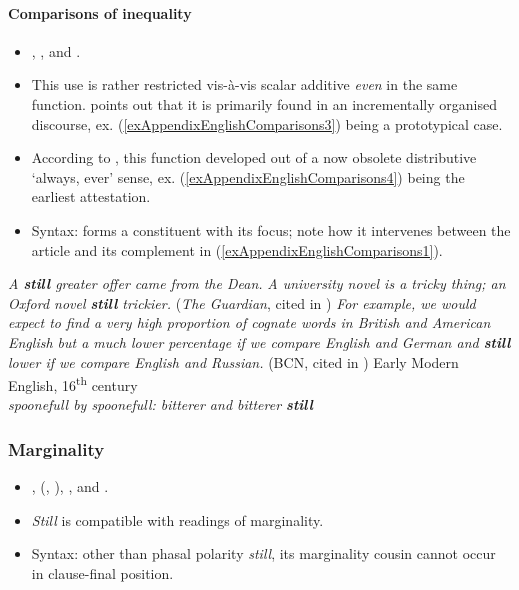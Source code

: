 \paragraph{Comparisons of inequality}\label{appendixEnglishComparisons}
\begin{itemize}
	\item \textcite{Ippolito2007} \textcite[145]{Koenig1991}, \textcite{Lewis2019}, \textcite[198–201]{Ranger2018} and \textcite[s.v. \textit{still}]{OED2022}.
	\item This use is rather restricted vis-à-vis scalar additive \textit{even} in the same function. \textcite{Ranger2018} points out that it is primarily found in an incrementally organised discourse, ex. (\ref{exAppendixEnglishComparisons3}) being a prototypical case.
	\item According to \textcite{Lewis2019}, this function developed out of a now obsolete distributive \lq always, ever\rq{ }sense, ex. (\ref{exAppendixEnglishComparisons4}) being the earliest attestation.
	\item Syntax: forms a constituent with its focus; note how it intervenes between the article and its complement in (\ref{exAppendixEnglishComparisons1}).
\end{itemize}

\begin{exe}
	\ex \textit{A \textbf{still} greater offer came from the Dean.} \parencite[23 fn37]{Ippolito2007}\label{exAppendixEnglishComparisons1}
	\ex\textit{A university novel is a tricky thing; an Oxford novel \textbf{still} trickier.} (\textit{The Guardian}, cited in \cite[129]{Lewis2019})
		\ex\label{exAppendixEnglishComparisons3}
		 \textit{For example, we would expect to find a very high proportion of cognate words in British and American English but a much lower percentage if we compare English and German and \textbf{still} lower if we compare English and Russian.} (BCN, cited in \cite[200]{Ranger2018})
\ex Early Modern English, 16\textsuperscript{th} century\label{exAppendixEnglishComparisons4}\\
	\textit{spoonefull by spoonefull: bitterer and bitterer 	\textbf{still}} \parencite[135]{Lewis2019}
\end{exe}


\subsubsection{Marginality}
\label{appendixEnglishMarginal}
\begin{itemize}
	\item \textcite{Beck2020}, \citeauthor{Koenig1977} (\citeyear{Koenig1977}, \citeyear[151–155]{Koenig1991}), \textcite{Ippolito2007}, \textcite{Michaelis1993} and \textcite[201–203]{Ranger2018}.
	\item \textit{Still} is compatible with readings of marginality.
	\item Syntax: other than phasal polarity \textit{still}, its marginality cousin cannot occur in clause-final position.
\end{itemize}
	
